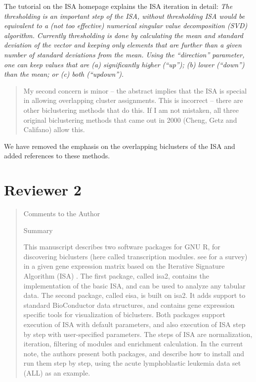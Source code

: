 \documentclass[a4paper]{article}
\newenvironment{myquote}{\begin{quote}\color{blue}}{\end{quote}}
\begin{document}
The tutorial on the ISA homepage explains the ISA iteration in detail:
\textsl{The thresholding is an important step of the ISA, without
  thresholding ISA would be equivalent to a (not too effective)
  numerical singular value decomposition (SVD) algorithm. Currently
  thresholding is done by calculating the mean and standard deviation
  of the vector and keeping only elements that are further than a
  given number of standard deviations from the mean. Using the
  ``direction'' parameter, one can keep values that are
  (a) significantly higher (``up''); (b) lower (``down'') than the
  mean; or (c) both (``updown'').}

\begin{myquote}
My second concern is minor – the abstract implies that the ISA is
special in allowing overlapping cluster assignments. This is incorrect
– there are other biclustering methods that do this. If I am not
mistaken, all three original biclustering methods that came out in
2000 (Cheng, Getz and Califano) allow this. 
\end{myquote}

We have removed the emphasis on the overlapping biclusters of the
ISA and added references to these methods.

\section*{Reviewer 2}

\begin{myquote}
Comments to the Author

Summary

This manuscript describes two software packages for GNU R, for
discovering biclusters (here called transcription modules. see \citet{tanay05} for
a survey) in a given gene expression matrix based on the Iterative
Signature Algorithm (ISA) \citep{isa}. The first package, called isa2,
contains the implementation of the basic ISA, and can be used to
analyze any tabular data. The second package, called eisa, is built on
isa2. It adds support to standard BioConductor \citep{BioC} data structures,
and contains gene expression specific tools for visualization of
biclusters. Both packages support execution of ISA with default
parameters, and also execution of ISA step by step with user-specified
parameters. The steps of ISA are normalization, iteration, filtering
of modules and enrichment calculation. In the current note, the
authors present both packages, and describe how to install and run
them step by step, using the acute lymphoblastic leukemia data set
(ALL) \citep{chiaretti04} as an example. 
\end{myquote}
\end{document}
